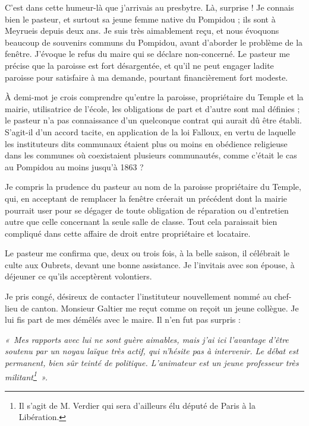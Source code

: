 
C’est dans cette humeur-là que j’arrivais au presbytre. Là, surprise ! Je connais bien le pasteur,
et surtout sa jeune femme native du Pompidou ; ils sont à Meyrueis depuis deux ans. Je suis
très aimablement reçu, et nous évoquons beaucoup de souvenirs communs du Pompidou,
avant d’aborder le problème de la fenêtre. J’évoque le refus du maire qui se déclare non-concerné. Le pasteur me précise que la paroisse est fort désargentée, et qu’il ne peut engager
ladite paroisse pour satisfaire à ma demande, pourtant financièrement fort modeste.

À demi-mot je crois comprendre qu’entre la paroisse, propriétaire du Temple et la mairie,
utilisatrice de l’école, les obligations de part et d’autre sont mal définies ; le pasteur n’a pas
connaissance d’un quelconque contrat qui aurait dû être établi. S’agit-il d’un accord tacite, en
application de la loi Falloux, en vertu de laquelle les instituteurs dits communaux étaient plus
ou moins en obédience religieuse dans les communes où coexistaient plusieurs communautés,
comme c’était le cas au Pompidou au moins jusqu’à 1863 ?

Je compris la prudence du pasteur au nom de la paroisse propriétaire du Temple, qui, en
acceptant de remplacer la fenêtre créerait un précédent dont la mairie pourrait user pour se
dégager de toute obligation de réparation ou d’entretien autre que celle concernant la seule
salle de classe. Tout cela paraissait bien compliqué dans cette affaire de droit entre propriétaire
et locataire.

Le pasteur me confirma que, deux ou trois fois, à la belle saison, il célébrait le culte aux
Oubrets, devant une bonne assistance. Je l’invitais avec son épouse, à déjeuner ce qu’ils
acceptèrent volontiers.


Je pris congé, désireux de contacter l’instituteur nouvellement nommé au chef-lieu de canton.
Monsieur Galtier me reçut comme on reçoit un jeune collègue. Je lui fis part de mes démêlés
avec le maire. Il n’en fut pas surpris :

\textit{«~Mes rapports avec lui ne sont guère aimables, mais j’ai ici l’avantage d’être soutenu par un
noyau laïque très actif, qui n’hésite pas à intervenir. Le débat est permanent, bien sûr teinté de
politique. L’animateur est un jeune professeur très militant\footnote{Il s’agit de M. Verdier qui sera
d’ailleurs élu député de Paris à la Libération.}~».}

